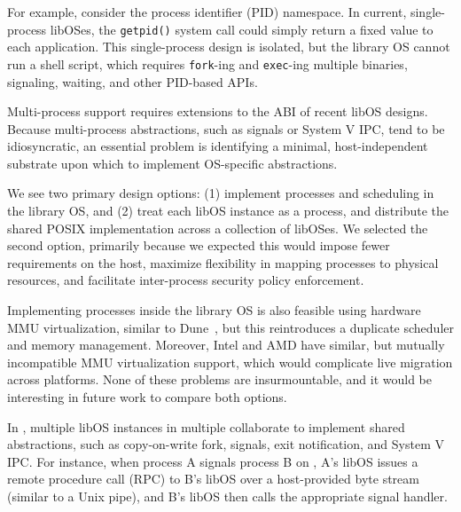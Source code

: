 
For example,
consider the process identifier (PID) namespace.
In current, single-process lib\-OSes, 
the {\tt getpid()} system call could simply return a fixed value to each application.
This  single-process design is isolated,
but the library OS cannot run a shell script, which requires {\tt fork}-ing and {\tt exec}-ing multiple binaries, signaling, waiting, and other
PID-based APIs.

\vspace{5pt}
Multi-process  support requires extensions to the \pal{} ABI of recent libOS designs.
Because multi-process abstractions, 
such as signals or System V IPC, 
tend to be idiosyncratic,
an essential problem is identifying a minimal, host-independent
substrate upon which 
to implement OS-specific abstractions.

We see two primary design options:
(1) implement processes and scheduling in 
the library OS, and (2) treat each libOS instance as a process, and distribute the 
shared POSIX implementation across a collection of libOSes.
We selected the second option, primarily because we expected this would impose fewer
requirements on the host, maximize flexibility in mapping processes 
to physical resources, and facilitate inter-process security policy enforcement. %

Implementing processes
inside the library OS is also feasible using 
hardware MMU virtualization, similar to Dune~\citep{belay12dune},
but this reintroduces a duplicate scheduler and memory management.
Moreover, Intel and AMD have similar, but mutually incompatible MMU virtualization support,
which would complicate live migration across platforms.
None of these problems are insurmountable, and it would be interesting in future
work to compare both options.

\vspace{5pt}
In \sysname{}, multiple libOS instances in multiple \picoprocs{} collaborate to 
implement shared abstractions, such as 
 copy-on-write fork, signals, exit notification,
and System V IPC.
For instance, when process A signals process B on \sysname{}, A's libOS issues
a remote procedure call (RPC) to B's libOS over a host-provided byte stream (similar to a Unix pipe),
and B's libOS then calls the appropriate signal handler.


